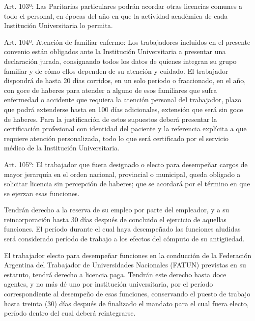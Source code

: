 \documentclass[]{article}
\begin{document}
Art. 103º: Las Paritarias particulares podrán acordar otras licencias
comunes a todo el personal, en épocas del año en que la actividad
académica de cada Institución Universitaria lo permita.

Art. 104º. Atención de familiar enfermo: Los trabajadores incluidos en
el presente convenio están obligados ante la Institución Universitaria a
presentar una declaración jurada, consignando todos los datos de quienes
integran su grupo familiar y de cómo ellos dependen de su atención y
cuidado. El trabajador dispondrá de hasta 20 días corridos, en un solo
período o fraccionado, en el año, con goce de haberes para atender a
alguno de esos familiares que sufra enfermedad o accidente que requiera
la atención personal del trabajador, plazo que podrá extenderse hasta en
100 días adicionales, extensión que será sin goce de haberes. Para la
justificación de estos supuestos deberá presentar la certificación
profesional con identidad del paciente y la referencia explícita a que
requiere atención personalizada, todo lo que será certificado por el
servicio médico de la Institución Universitaria.

Art. 105º: El trabajador que fuera designado o electo para desempeñar
cargos de mayor jerarquía en el orden nacional, provincial o municipal,
queda obligado a solicitar licencia sin percepción de haberes; que se
acordará por el término en que se ejerzan esas funciones.

Tendrán derecho a la reserva de su empleo por parte del empleador, y a
su reincorporación hasta 30 días después de concluido el ejercicio de
aquellas funciones. El período durante el cual haya desempeñado las
funciones aludidas será considerado período de trabajo a los efectos del
cómputo de su antigüedad.

El trabajador electo para desempeñar funciones en la conducción de la
Federación Argentina del Trabajador de Universidades Nacionales (FATUN)
previstas en su estatuto, tendrá derecho a licencia paga. Tendrán este
derecho hasta doce agentes, y no más dé uno por institución
universitaria, por el período correspondiente al desempeño de esas
funciones, conservando el puesto de trabajo hasta treinta (30) días
después de finalizado el mandato para el cual fuera electo, período
dentro del cual deberá reintegrarse.
\end{document}
